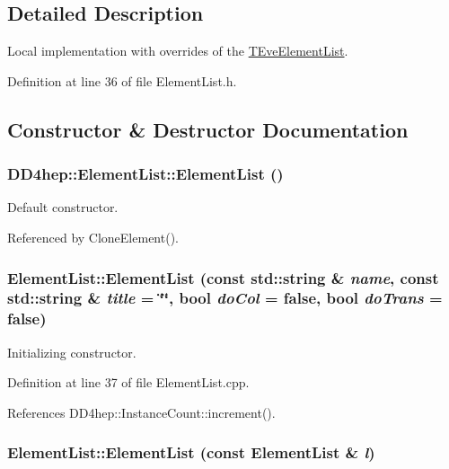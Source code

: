 \subsection{Detailed Description}
Local implementation with overrides of the \hyperlink{class_t_eve_element_list}{TEveElementList}. 

Definition at line 36 of file ElementList.h.

\subsection{Constructor \& Destructor Documentation}
\hypertarget{class_d_d4hep_1_1_element_list_add023eff52a3dc205c33891c200cace1}{
\subsubsection[{ElementList}]{\setlength{\rightskip}{0pt plus 5cm}DD4hep::ElementList::ElementList ()}}
\label{class_d_d4hep_1_1_element_list_add023eff52a3dc205c33891c200cace1}


Default constructor. 

Referenced by CloneElement().\hypertarget{class_d_d4hep_1_1_element_list_a9ac013ec9cc0b96d6c31e19401765833}{
\subsubsection[{ElementList}]{\setlength{\rightskip}{0pt plus 5cm}ElementList::ElementList (const std::string \& {\em name}, \/  const std::string \& {\em title} = {\ttfamily \char`\"{}\char`\"{}}, \/  bool {\em doCol} = {\ttfamily false}, \/  bool {\em doTrans} = {\ttfamily false})}}
\label{class_d_d4hep_1_1_element_list_a9ac013ec9cc0b96d6c31e19401765833}


Initializing constructor. 

Definition at line 37 of file ElementList.cpp.

References DD4hep::InstanceCount::increment().\hypertarget{class_d_d4hep_1_1_element_list_a573686af3429e4ddceac2062f16d704f}{
\subsubsection[{ElementList}]{\setlength{\rightskip}{0pt plus 5cm}ElementList::ElementList (const {\bf ElementList} \& {\em l})}}
\label{class_d_d4hep_1_1_element_list_a573686af3429e4ddceac2062f16d704f}



